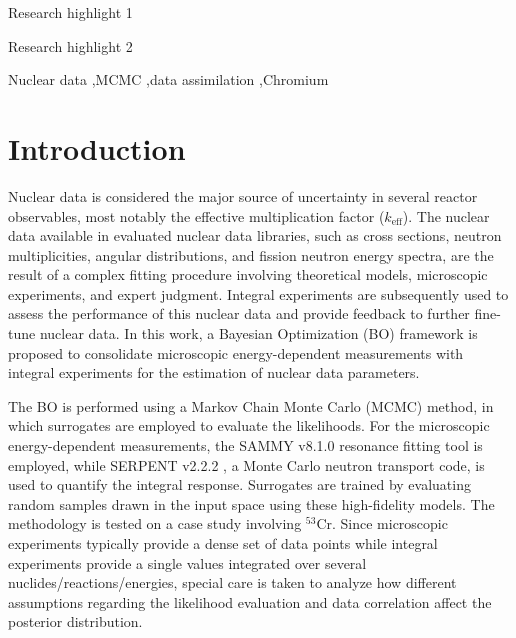 \documentclass[preprint,review,12pt]{elsarticle}
\newcommand{\keff}{$k_\text{eff}$}
\newcommand{\nuclide}[2]{$^{#1}$#2}
\begin{document}
\begin{frontmatter}
\begin{highlights}
\item Research highlight 1
\item Research highlight 2
\end{highlights}

\begin{keyword}
Nuclear data \sep MCMC \sep data assimilation \sep Chromium


\end{keyword}

\end{frontmatter}

\linenumbers


\section{Introduction}
Nuclear data is considered the major source of uncertainty in several reactor observables, most notably the effective multiplication factor (\keff{}). The nuclear data available in evaluated nuclear data libraries, such as cross sections, neutron multiplicities, angular distributions, and fission neutron energy spectra, are the result of a complex fitting procedure involving theoretical models, microscopic experiments, and expert judgment. Integral experiments are subsequently used to assess the performance of this nuclear data and provide feedback to further fine-tune nuclear data. In this work, a Bayesian Optimization (BO) framework is proposed to consolidate microscopic energy-dependent measurements with integral experiments for the estimation of nuclear data parameters.

The BO is performed using a Markov Chain Monte Carlo (MCMC) method, in which surrogates are employed to evaluate the likelihoods. For the microscopic energy-dependent measurements, the SAMMY v8.1.0 resonance fitting tool \cite{larsonUpdatedUsersGuide2008} is employed, while SERPENT v2.2.2 \cite{leppanenSerpentMonteCarlo2015}, a Monte Carlo neutron transport code, is used to quantify the integral response. Surrogates are trained by evaluating random samples drawn in the input space using these high-fidelity models. The methodology is tested on a case study involving \nuclide{53}{Cr}. Since microscopic experiments typically provide a dense set of data points while integral experiments provide a single values integrated over several nuclides/reactions/energies, special care is taken to analyze how different assumptions regarding the likelihood evaluation and data correlation affect the posterior distribution.
\end{document}
